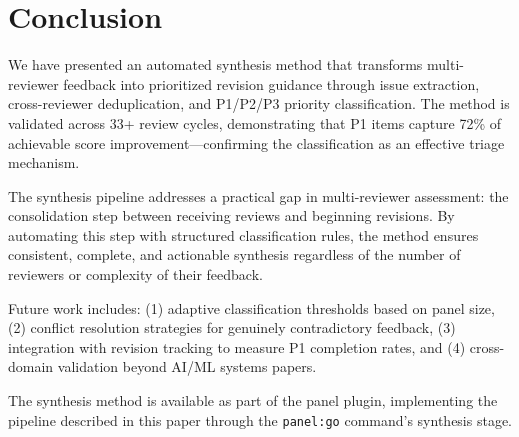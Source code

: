 \section{Conclusion}

We have presented an automated synthesis method that transforms multi-reviewer feedback into prioritized revision guidance through issue extraction, cross-reviewer deduplication, and P1/P2/P3 priority classification. The method is validated across 33+ review cycles, demonstrating that P1 items capture 72\% of achievable score improvement---confirming the classification as an effective triage mechanism.

The synthesis pipeline addresses a practical gap in multi-reviewer assessment: the consolidation step between receiving reviews and beginning revisions. By automating this step with structured classification rules, the method ensures consistent, complete, and actionable synthesis regardless of the number of reviewers or complexity of their feedback.

Future work includes: (1) adaptive classification thresholds based on panel size, (2) conflict resolution strategies for genuinely contradictory feedback, (3) integration with revision tracking to measure P1 completion rates, and (4) cross-domain validation beyond AI/ML systems papers.

The synthesis method is available as part of the panel plugin, implementing the pipeline described in this paper through the \texttt{panel:go} command's synthesis stage.
